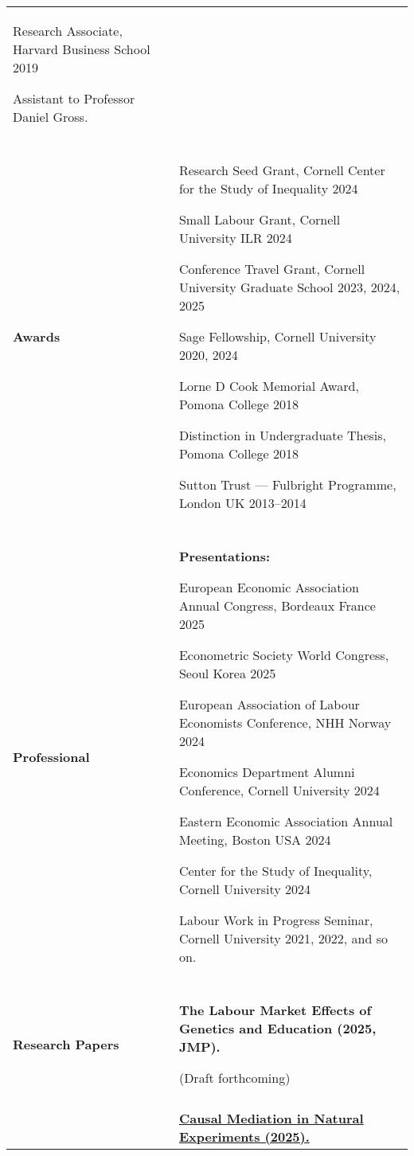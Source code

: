 \documentclass[letterpaper,11pt,oneside]{article}
\begin{document}
\begin{longtable}[\textwidth]{p{} p{}}
    Research Associate, Harvard Business School \hfill 2019

    \indent\hspace{1cm} Assistant to Professor Daniel Gross. \\ \\

\textbf{Awards}
    & Research Seed Grant, Cornell Center for the Study of Inequality \hfill 2024
    
    Small Labour Grant, Cornell University ILR \hfill 2024
    
    Conference Travel Grant, Cornell University Graduate School \hfill 2023, 2024, 2025
    
    Sage Fellowship, Cornell University \hfill 2020, 2024
    
    Lorne D Cook Memorial Award, Pomona College \hfill 2018
    
    Distinction in Undergraduate Thesis, Pomona College \hfill 2018
    
    Sutton Trust --- Fulbright Programme, London UK \hfill 2013--2014 \\ \\

\textbf{Professional}
    & \textbf{Presentations:}

    European Economic Association Annual Congress, Bordeaux France \hfill 2025

    Econometric Society World Congress, Seoul Korea \hfill 2025

    European Association of Labour Economists Conference, NHH Norway \hfill 2024

    Economics Department Alumni Conference, Cornell University \hfill 2024

    Eastern Economic Association Annual Meeting, Boston USA \hfill 2024

    Center for the Study of Inequality, Cornell University \hfill 2024

    Labour Work in Progress Seminar, Cornell University \hfill 2021, 2022, and so on. \\ \\

\textbf{Research Papers}
    & \textbf{The Labour Market Effects of Genetics and Education (2025, JMP).}

    (Draft forthcoming)  \\ \\

    & \textbf{\href{https://raw.githubusercontent.com/shoganhennessy/mediation-natural-experiment/main/mediation-natural-experiment-2025.pdf}{
        Causal Mediation in Natural Experiments (2025).}}


\end{longtable}
\end{document}
